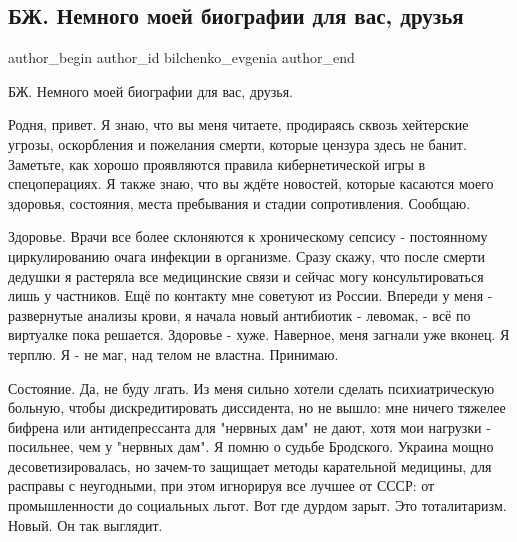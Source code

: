  
 
 
 
 
 
\subsection{БЖ. Немного моей биографии для вас, друзья}
\label{sec:23_07_2021.fb.bilchenko_evgenia.1.biografia}
 
\ifcmt
 author_begin
   author_id bilchenko_evgenia
 author_end
\fi

БЖ. Немного моей биографии для вас, друзья.

Родня, привет. Я знаю, что вы меня читаете, продираясь сквозь хейтерские
угрозы, оскорбления и пожелания смерти, которые цензура здесь не банит.
Заметьте, как хорошо проявляются правила кибернетической игры в спецоперациях.
Я также знаю, что вы ждёте новостей, которые касаются моего здоровья,
состояния, места пребывания и стадии сопротивления. Сообщаю.

Здоровье. Врачи все более склоняются к хроническому сепсису - постоянному
циркулированию очага инфекции в организме. Сразу скажу, что после смерти
дедушки я растеряла все медицинские связи и сейчас могу консультироваться лишь
у частников. Ещё по контакту мне советуют из России. Впереди у меня -
развернутые анализы крови, я начала новый антибиотик - левомак, - всё по
виртуалке пока решается. Здоровье - хуже. Наверное, меня загнали уже вконец. Я
терплю. Я - не маг, над телом не властна. Принимаю.

Состояние. Да, не буду лгать. Из меня сильно хотели сделать психиатрическую
больную, чтобы дискредитировать диссидента, но не вышло: мне ничего тяжелее
бифрена или антидепрессанта для "нервных дам" не дают, хотя мои нагрузки -
посильнее, чем у "нервных дам". Я помню о судьбе Бродского. Украина мощно
десоветизировалась, но зачем-то защищает методы карательной медицины, для
расправы с неугодными, при этом игнорируя все лучшее от СССР: от промышленности
до социальных льгот. Вот где дурдом зарыт. Это тоталитаризм. Новый. Он так
выглядит.

